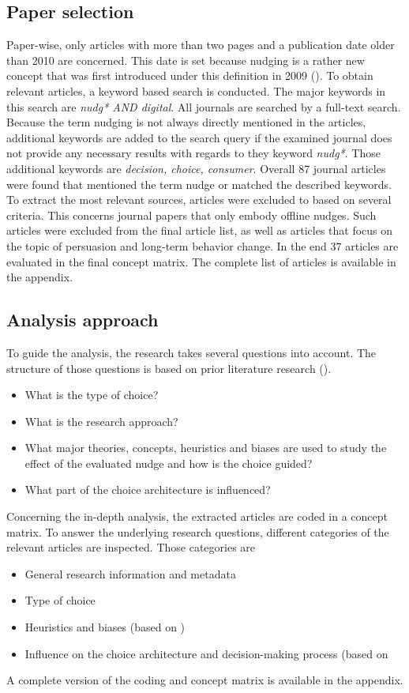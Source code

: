 \subsection{Paper selection}
Paper-wise, only articles with more than two pages and a publication date older than 2010 are concerned. This date is set because nudging is a rather new concept that was first introduced under this definition in 2009 (\cite{thaler_nudge:_2009}). To obtain relevant articles, a keyword based search is conducted. The major keywords in this search are \textit{nudg* AND digital}. All journals are searched by a full-text search. Because the term nudging is not always directly mentioned in the articles, additional keywords are added to the search query if the examined journal does not provide any necessary results with regards to they keyword \textit{nudg*}. Those additional keywords are \textit{decision, choice, consumer}. Overall 87 journal articles were found that mentioned the term nudge or matched the described keywords. To extract the most relevant sources, articles were excluded to based on several criteria. This concerns journal papers that only embody offline nudges. Such articles were excluded from the final article list, as well as articles that focus on the topic of persuasion and long-term behavior change. In the end 37 articles are evaluated in the final concept matrix. The complete list of articles is available in the appendix. %

\subsection{Analysis approach}
To guide the analysis, the research takes several questions into account. The structure of those questions is based on prior literature research (\cite{alavi_review_1992}).
\begin{itemize}
\item What is the type of choice?
\item What is the research approach?
\item What major theories, concepts, heuristics and biases are used to study the effect of the evaluated nudge and how is the choice guided?
\item What part of the choice architecture is influenced?
\end{itemize}

Concerning the in-depth analysis, the extracted articles are coded in a concept matrix. To answer the underlying research questions, different categories of the relevant articles are inspected. Those categories are 
\begin{itemize}
\item General research information and metadata
\item Type of choice
\item Heuristics and biases (based on \cite{schneider_digital_2018})
\item Influence on the choice architecture and decision-making process (based on \cite{munscher_review_2016}
\end{itemize}

A complete version of the coding and concept matrix is available in the appendix. %